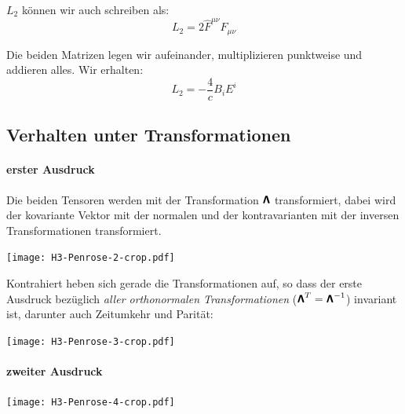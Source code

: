 %

$L_2$ können wir auch schreiben als:
\[
	L_2 = 2 \hat F^{\mu\nu} F_{\mu\nu}
\]

Die beiden Matrizen legen wir aufeinander, multiplizieren punktweise und
addieren alles. Wir erhalten:
\[
	L_2 = - \frac 4c B_i E^i
\]

\subsection{Verhalten unter Transformationen}

\paragraph{erster Ausdruck}

Die beiden Tensoren werden mit der Transformation $\boldsymbol{\mathsf{\Lambda}}$
transformiert, dabei wird der kovariante Vektor mit der normalen und der
kontravarianten mit der inversen Transformationen transformiert.
\begin{center}
	\texttt{[image: H3-Penrose-2-crop.pdf]}
\end{center}

Kontrahiert heben sich gerade die Transformationen auf, so dass der erste
Ausdruck bezüglich \emph{aller orthonormalen Transformationen} ($\boldsymbol{\mathsf{\Lambda}}^T = \boldsymbol{\mathsf{\Lambda}}^{-1}$) invariant ist, darunter auch Zeitumkehr und
Parität:
\begin{center}
	\texttt{[image: H3-Penrose-3-crop.pdf]}
\end{center}

\paragraph{zweiter Ausdruck}

\begin{center}
	\texttt{[image: H3-Penrose-4-crop.pdf]}
\end{center}

